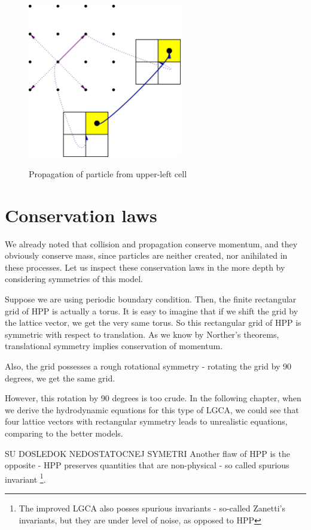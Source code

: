\begin{figure} [H]
 \centering
 \includegraphics[width=0.6\textwidth]{./img/HPPprop}
 \label{hpp-colision}
 \caption{Propagation of particle from upper-left cell}
\end{figure}

\bigskip

\section{Conservation laws}

We already noted that collision and propagation conserve momentum, and they obviously conserve mass, since particles are neither created, nor anihilated in these processes. 
Let us inspect these conservation laws in the more depth by considering symmetries of this model.

Suppose we are using periodic boundary condition. Then, the finite rectangular grid of HPP is actually a torus. It is easy to imagine that if we shift the grid by the lattice vector, we get the very same torus.
So this rectangular grid of HPP is symmetric with respect to translation.
As we know by Norther's theorems, translational symmetry implies conservation of momentum.

\bigskip

Also, the grid possesses a rough rotational symmetry - rotating the grid by 90 degrees, we get the same grid.

However, this rotation by 90 degrees is too crude.
In the following chapter, when we derive the hydrodynamic equations for this type of LGCA, we could see that four lattice vectors with rectangular symmetry leads to unrealistic equations, comparing to the better models.

\bigskip
SU DOSLEDOK NEDOSTATOCNEJ SYMETRI
Another flaw of HPP is the opposite - HPP preserves quantities that are non-physical - so called spurious invariant \footnote{The improved LGCA also posses spurious invariants - so-called Zanetti's invariants, but they are under level of noise, as opposed to HPP}.

